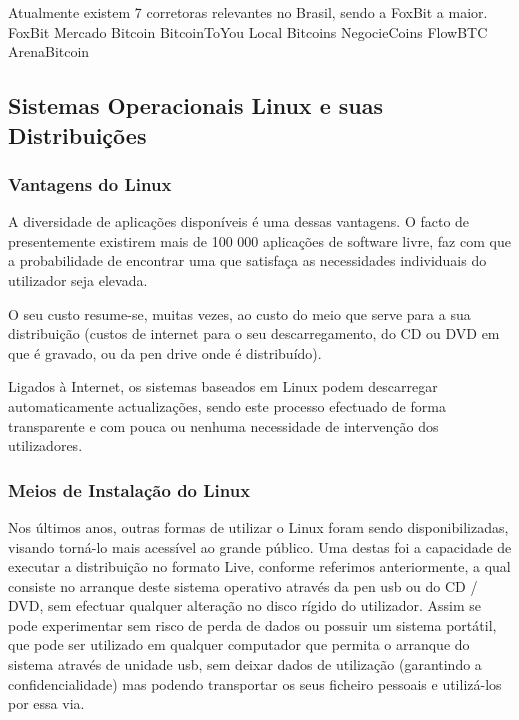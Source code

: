 \documentclass[
	article,			%
	12pt,				%
	openright,			%
	oneside,			%
	a4paper,			%
	chapter=TITLE,		%
	section=TITLE,		%
	subsection=TITLE,	%
	subsubsection=TITLE,%
	subsubsubsection=TITLE, %
	english,			%
	brazil,				%
	]{abntex2}
\begin{document}
Atualmente existem 7 corretoras relevantes no Brasil, sendo a FoxBit a maior.
FoxBit Mercado Bitcoin BitcoinToYou Local Bitcoins NegocieCoins FlowBTC ArenaBitcoin

\cite{Prado2017}

\subsection{Sistemas Operacionais Linux e suas Distribuições}

\subsubsection{Vantagens do Linux}

A diversidade de aplicações disponíveis é uma dessas vantagens. O facto de presentemente existirem mais de 100 000 aplicações de software livre, faz com que a probabilidade de encontrar uma que satisfaça as necessidades individuais do utilizador seja elevada.

O seu custo resume-se, muitas vezes, ao custo do meio que serve para a sua distribuição (custos de internet para o seu descarregamento, do CD ou DVD em que é gravado, ou da pen drive onde é distribuído).

Ligados à Internet, os sistemas baseados em Linux podem descarregar automaticamente actualizações, sendo este processo efectuado de forma transparente e com pouca ou nenhuma necessidade de intervenção dos utilizadores.

\cite{Nunes2009}

\subsubsection{Meios de Instalação do Linux}

Nos últimos anos, outras formas de utilizar o Linux foram sendo disponibilizadas, visando torná-lo mais acessível ao grande público. Uma destas foi a capacidade de executar a distribuição no formato Live, conforme referimos anteriormente, a qual consiste no arranque deste sistema operativo através da pen usb ou do CD / DVD, sem efectuar qualquer alteração no disco rígido do utilizador. Assim se pode experimentar sem risco de perda de dados ou possuir um sistema portátil, que pode ser utilizado em qualquer computador que permita o arranque do sistema através de unidade usb, sem deixar dados de utilização (garantindo a confidencialidade) mas podendo transportar os seus ficheiro pessoais e utilizá-los por essa via.
\end{document}
